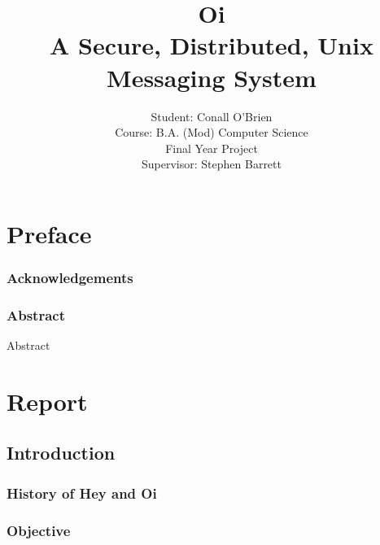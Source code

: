 \documentclass[a4paper,12pt]{report}
\begin{document}
\title{Oi \\ A Secure, Distributed, Unix Messaging System}

\author{Student: Conall O'Brien \\ 
		  Course:  B.A. (Mod) Computer Science \\
		  Final Year Project \\ 
		  Supervisor: Stephen Barrett} 

\maketitle


\part*{Preface}


\section{Acknowledgements}



\pagebreak

\section{Abstract}

Abstract


\tableofcontents

\listoftables

\listoffigures


\part*{Report}


\chapter{Introduction}

\setcounter{page}{12}

\section{History of Hey and Oi}



\section{Objective}
\end{document}
